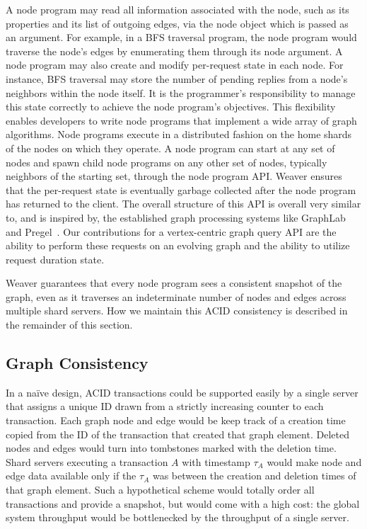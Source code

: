\documentclass[letterpaper,twocolumn,11pt,tight]{article}
\begin{document}
A node program may read all information associated with the node, such as its properties
    and its list of outgoing edges, via the node object which is passed
    as an argument. For example, in a BFS traversal program, the node program would traverse the
    node's edges by enumerating them through its node argument.
A node program may also create and modify per-request state in each node. For instance,
    BFS traversal may store the number of pending replies from a node's neighbors within the
    node itself. It is the programmer's responsibility to manage this state correctly to achieve
    the node program's objectives. This flexibility enables developers to write node programs that 
    implement a wide array of graph algorithms.
Node programs execute in a distributed fashion on the home shards of the nodes on which
    they operate. A node program can start at any set of nodes and spawn child node programs
    on any other set of nodes, typically neighbors of the starting set, through the node 
    program API. 
Weaver ensures that the per-request state is eventually
    garbage collected after the node program has returned to the client.
The overall structure of this API is overall very similar to, and is inspired
by, the established graph processing systems like GraphLab~\cite{powergraph} and
Pregel~\cite{pregel}.
Our contributions for a vertex-centric graph query API are the ability to perform these requests on an evolving graph and the ability to utilize request duration state.


Weaver guarantees that every node program sees a consistent snapshot of the graph, even as it traverses an indeterminate number of nodes and edges across multiple shard servers.
How we maintain this ACID consistency is described in the remainder of this section.

\subsection{Graph Consistency}
In a na\"ive design, ACID transactions could be supported easily by a single server that 
    assigns a unique ID drawn from a strictly increasing counter to each
    transaction. Each graph node and edge would be keep track of a creation time
    copied from the ID of the transaction that created that graph element. Deleted
    nodes and edges would turn into tombstones marked with the deletion time.
    Shard servers executing a transaction $A$ with timestamp $\tau_A$ would 
    make node and edge data available only if the $\tau_A$ was between the creation
    and deletion times of that graph element. 
Such a hypothetical scheme would totally order all transactions and provide a snapshot, 
    but would come with a high cost: the global system throughput would be bottlenecked by the
    throughput of a single server.
\end{document}
